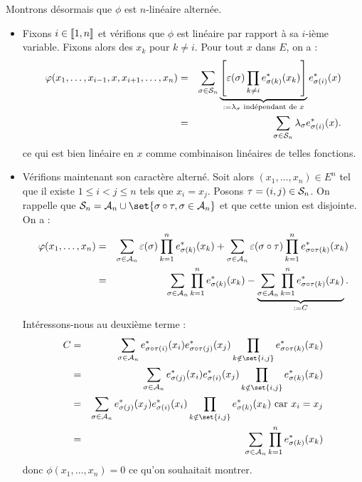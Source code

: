 \documentclass{magnolia}
\begin{document}
\begin{preuve}
\begin{itemize}
Montrons désormais que $\phi$ est $n$-linéaire alternée.
\begin{itemize}
\item Fixons $i\in \left\llbracket 1,n\right\rrbracket$ et vérifions que $\phi$ est linéaire par rapport à sa $i$-ième variable. Fixons alors des $x_k$ pour $k\neq i$. Pour tout $x$ dans $E$, on a :
\begin{eqnarray*}
\varphi(x_1,\ldots,x_{i-1},x,x_{i+1},\ldots,x_n)&=&\sum_{\sigma\in \mathcal{S}_{n}}\underbrace{\left[\varepsilon(\sigma)\prod_{k\neq i}e_{\sigma(k)}^*(x_k)\right]}_{:=\lambda_{\sigma} \text{ indépendant de } x}e_{\sigma(i)}^*(x)\\
&=&\sum_{\sigma\in \mathcal{S}_{n}}\lambda_{\sigma}e_{\sigma(i)}^*(x).
\end{eqnarray*} ce qui est bien linéaire en $x$ comme combinaison linéaires de telles fonctions.
\item Vérifions maintenant son caractère alterné. Soit alors $(x_1,\ldots,x_n) \in E^n$ tel que il existe $1\leq i<j\leq n$ tels que $x_i=x_j$. Posons $\tau=(i,j) \in \mathcal{S}_{n}$. On rappelle que $\gsym{n}=\galt{n}\cup \set{\sigma\circ \tau, \sigma \in \galt{n}}$ et que cette union est disjointe. On a :
\begin{eqnarray*}
\varphi(x_1,\ldots,x_n)&=&\sum_{\sigma\in \mathcal{A}_{n}}\varepsilon(\sigma)\prod_{k=1}^ne_{\sigma(k)}^*(x_k)+\sum_{\sigma\in \mathcal{A}_{n}}\varepsilon(\sigma\circ \tau)\prod_{k=1}^ne_{\sigma\circ \tau(k)}^*(x_k)\\
&=&\sum_{\sigma\in \mathcal{A}_{n}}\prod_{k=1}^ne_{\sigma(k)}^*(x_k)-\underbrace{\sum_{\sigma\in \mathcal{A}_{n}}\prod_{k=1}^ne_{\sigma\circ \tau(k)}^*(x_k)}_{:=C}.
\end{eqnarray*}
Intéressons-nous au deuxième terme :
\begin{eqnarray*}
C&=&\sum_{\sigma\in \galt{n}}e_{\sigma\circ \tau(i)}^*(x_i)e_{\sigma\circ \tau(j)}^*(x_j)\prod_{k\notin\set{i,j}}e_{\sigma\circ \tau(k)}^*(x_k)\\
&=&\sum_{\sigma\in \galt{n}}e_{\sigma(j)}^*(x_i)e_{\sigma(i)}^*(x_j)\prod_{k\notin\set{i,j}}e_{\sigma(k)}^*(x_k)\\
&=&\sum_{\sigma\in \galt{n}}e_{\sigma(j)}^*(x_j)e_{\sigma(i)}^*(x_i)\prod_{k\notin\set{i,j}}e_{\sigma(k)}^*(x_k) \text{ car } x_i=x_j\\
&=&\sum_{\sigma\in \galt{n}}\prod_{k=1}^ne_{\sigma(k)}^*(x_k)
\end{eqnarray*}
donc $\phi(x_1,\ldots,x_n)=0$ ce qu'on souhaitait montrer.
\end{itemize}

\end{itemize}

\end{preuve}
\end{document}
